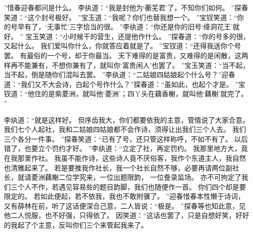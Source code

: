 ”惜春迎春都问是什么。
李纨道：“我是封他为‘蘅芜君’了，不知你们如何。
”探春笑道：“这个封号极好。
”宝玉道：“我呢？你们也替我想一个。
”宝钗笑道：“你的号早有了，‘无事忙’三字恰当的很。
”李纨道：“你还是你的旧号‘绛洞花王’就好。
”
宝玉笑道：“小时候干的营生，还提他作什么。
”探春道：“你的号多的很，又起什么。
我们爱叫你什么，你就答应着就是了。
”宝钗道：“还得我送你个号罢。
有最俗的一个号，却于你最当。
天下难得的是富贵，又难得的是闲散，这两样再不能兼有，不想你兼有了，就叫你‘富贵闲人’也罢了。
”宝玉笑道：“当不起，当不起，倒是随你们混叫去罢。
”李纨道：“二姑娘四姑娘起个什么号？”迎春道：“我们又不大会诗，白起个号作什么？”探春道：“虽如此，也起个才是。
”宝钗道：“他住的是紫菱洲，就叫他‘菱洲’；四丫头在藕香榭，就叫他‘藕榭’就完了。
”\par
李纨道：“就是这样好。
但序齿我大，你们都要依我的主意，管情说了大家合意。
我们七个人起社，我和二姑娘四姑娘都不会作诗，须得让出我们三个人去。
我们三个各分一件事。
”探春笑道：“已有了号，还只管这样称呼，不如不有了。
以后错了，也要立个罚约才好。
”李纨道：“立定了社，再定罚约。
我那里地方大，竟在我那里作社。
我虽不能作诗，这些诗人竟不厌俗客，我作个东道主人，我自然也清雅起来了。
若是要推我作社长，我一个社长自然不够，必要再请两位副社长，就请菱洲藕榭二位学究来，一位出题限韵，
一位誊录监场。
亦不可拘定了我们三个人不作，若遇见容易些的题目韵脚，我们也随便作一首。
你们四个却是要限定的。
若如此便起，若不依我，我也不敢附骥了。
”迎春惜春本性懒于诗词，又有薛林在前，听了这话便深合己意，二人皆说：“极是。
”探春等也知此意，见他二人悦服，也不好强，只得依了。
因笑道：“这话也罢了，只是自想好笑，好好的我起了个主意，反叫你们三个来管起我来了。
